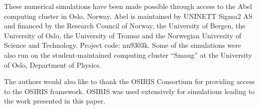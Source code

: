 \documentclass[aps,prstab,reprint,amsmath,amssymb,groupedaddress]{revtex4-1}
\begin{document}
These numerical simulations have been made possible through access to the Abel computing cluster in Oslo, Norway. Abel
is maintained by UNINETT Sigma2 AS and financed by the Research Council of Norway, the University of Bergen, the
University of Oslo, the University of Tromsø and the Norwegian University of Science and Technology. Project code:
nn9303k. Some of the simulations were also run on the student-maintained computing cluster ``Smaug'' at the University
of Oslo, Department of Physics.

The authors would also like to thank the OSIRIS Consortium for providing access to the OSIRIS framework. OSIRIS was used
extensively for simulations leading to the work presented in this paper.


\end{document}
